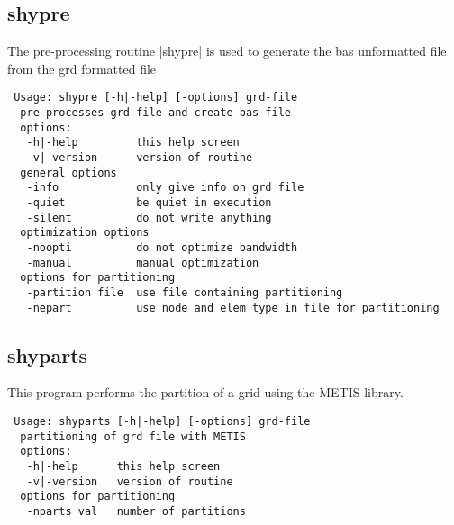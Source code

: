 \subsection{shypre}
The pre-processing routine |shypre| is used to generate the bas unformatted 
file from the grd formatted file

\begin{verbatim}
 Usage: shypre [-h|-help] [-options] grd-file
  pre-processes grd file and create bas file
  options:
   -h|-help         this help screen
   -v|-version      version of routine
  general options
   -info            only give info on grd file
   -quiet           be quiet in execution
   -silent          do not write anything
  optimization options
   -noopti          do not optimize bandwidth
   -manual          manual optimization
  options for partitioning
   -partition file  use file containing partitioning
   -nepart          use node and elem type in file for partitioning
\end{verbatim}

\subsection{shyparts}
This program performs the partition of a grid using the METIS library.

\begin{verbatim}
 Usage: shyparts [-h|-help] [-options] grd-file
  partitioning of grd file with METIS
  options:
   -h|-help      this help screen
   -v|-version   version of routine
  options for partitioning
   -nparts val   number of partitions
\end{verbatim}
